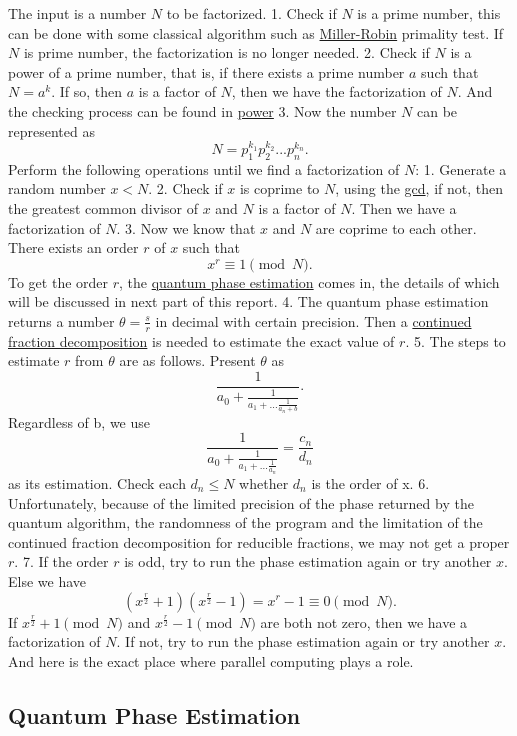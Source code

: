 \documentclass[11pt]{article}
\begin{document}
The input is a number \(N\) to be factorized. 1. Check if \(N\) is a
prime number, this can be done with some classical algorithm such as
\href{./Classical/miller-robin.py}{Miller-Robin} primality test. If
\(N\) is prime number, the factorization is no longer needed. 2. Check
if \(N\) is a power of a prime number, that is, if there exists a prime
number \(a\) such that \(N = a^k\). If so, then \(a\) is a factor of
\(N\), then we have the factorization of \(N\). And the checking process
can be found in \href{./Classical/power.py}{power} 3. Now the number
\(N\) can be represented as \[N = p_1^{k_1} p_2^{k_2} ... p_n^{k_n}.\]
Perform the following operations until we find a factorization of \(N\):
1. Generate a random number \(x < N\). 2. Check if \(x\) is coprime to
\(N\), using the \href{./Classical/gcd.py}{gcd}, if not, then the
greatest common divisor of \(x\) and \(N\) is a factor of \(N\). Then we
have a factorization of \(N\). 3. Now we know that \(x\) and \(N\) are
coprime to each other. There exists an order \(r\) of \(x\) such that
\[x^r \equiv 1 \pmod N.\] To get the order \(r\), the
\href{./myShorLib/Operation.qs}{quantum phase estimation} comes in, the
details of which will be discussed in next part of this report. 4. The
quantum phase estimation returns a number \(\theta = \frac{s}{r}\) in
decimal with certain precision. Then a
\href{./Classical/fraction.py}{continued fraction decomposition} is
needed to estimate the exact value of \(r\). 5. The steps to estimate
\(r\) from \(\theta\) are as follows. Present \(\theta\) as
\[\frac{1}{a_0 + \frac{1}{a_1 + \dots \frac{1}{a_n + b}}}.\] Regardless
of b, we use
\[\frac{1}{a_0 + \frac{1}{a_1 + \dots \frac{1}{a_n}}} = \frac{c_n}{d_n}\]
as its estimation. Check each \(d_n \leq N\) whether \(d_n\) is the
order of x. 6. Unfortunately, because of the limited precision of the
phase returned by the quantum algorithm, the randomness of the program
and the limitation of the continued fraction decomposition for reducible
fractions, we may not get a proper \(r\). 7. If the order \(r\) is odd,
try to run the phase estimation again or try another \(x\). Else we have
\[(x^{\frac{r}{2}} + 1)(x^{\frac{r}{2}} - 1) = x^r - 1 \equiv 0 \pmod N.\]
If \(x^{\frac{r}{2}} + 1 \pmod N\) and \(x^{\frac{r}{2}} - 1 \pmod N\)
are both not zero, then we have a factorization of \(N\). If not, try to
run the phase estimation again or try another \(x\). And here is the
exact place where parallel computing plays a role.

\subsection{Quantum Phase Estimation}\label{quantum-phase-estimation}
\end{document}
